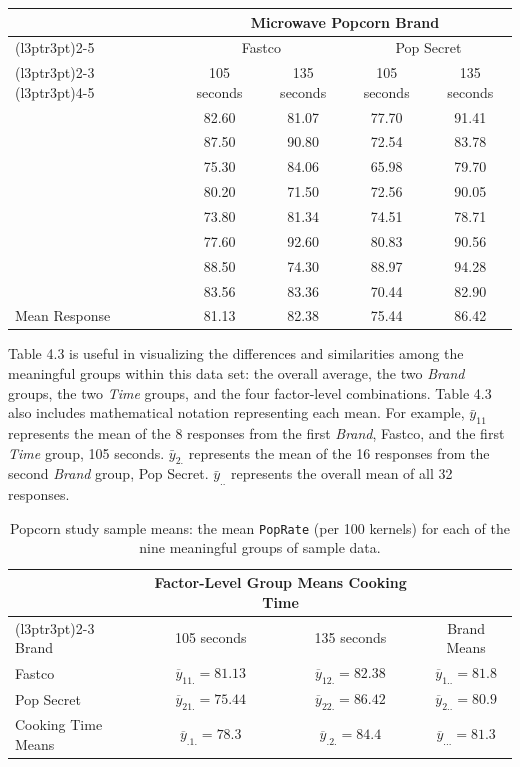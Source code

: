 \documentclass[
]{report}
\begin{document}
\begin{table}[!h]
\centering
\begin{tabular}{lcccc}
\toprule
\multicolumn{1}{c}{ } & \multicolumn{4}{c}{Microwave Popcorn Brand} \\
\cmidrule(l{3pt}r{3pt}){2-5}
\multicolumn{1}{c}{ } & \multicolumn{2}{c}{Fastco} & \multicolumn{2}{c}{Pop Secret} \\
\cmidrule(l{3pt}r{3pt}){2-3} \cmidrule(l{3pt}r{3pt}){4-5}
 & 105 seconds & 135 seconds & 105 seconds & 135 seconds\\
\midrule
 & 82.60 & 81.07 & 77.70 & 91.41\\
 & 87.50 & 90.80 & 72.54 & 83.78\\
 & 75.30 & 84.06 & 65.98 & 79.70\\
 & 80.20 & 71.50 & 72.56 & 90.05\\
 & 73.80 & 81.34 & 74.51 & 78.71\\
\addlinespace
 & 77.60 & 92.60 & 80.83 & 90.56\\
 & 88.50 & 74.30 & 88.97 & 94.28\\
 & 83.56 & 83.36 & 70.44 & 82.90\\
Mean Response & 81.13 & 82.38 & 75.44 & 86.42\\
\bottomrule
\end{tabular}
\end{table}

Table 4.3 is useful in visualizing the differences and similarities among the meaningful groups within this data set: the overall average, the two \emph{Brand} groups, the two \emph{Time} groups, and the four factor-level combinations. Table 4.3 also includes mathematical notation representing each mean. For example, \(\bar{y}_{11}\) represents the mean of the 8 responses from the first \emph{Brand}, Fastco, and the first \emph{Time} group, 105 seconds. \(\bar{y}_{2.}\) represents the mean of the 16 responses from the second \emph{Brand} group, Pop Secret. \(\bar{y}_{..}\) represents the overall mean of all 32 responses.

\begin{table}[!h]
\centering
\caption{\label{tab:tab3} Popcorn study sample means: the mean \texttt{PopRate} (per 100 kernels) for each of the nine meaningful groups of sample data.}
\centering
\begin{tabular}[t]{lccc}
\toprule
\multicolumn{1}{c}{ } & \multicolumn{2}{c}{Factor-Level Group Means Cooking Time} & \multicolumn{1}{c}{ } \\
\cmidrule(l{3pt}r{3pt}){2-3}
Brand & 105 seconds & 135 seconds & Brand Means\\
\midrule
Fastco & $\overline{y}_{11.} = 81.13$ & $\overline{y}_{12.} = 82.38$ & $\overline{y}_{1..} = 81.8$\\
Pop Secret & $\overline{y}_{21.} = 75.44$ & $\overline{y}_{22.} = 86.42$ & $\overline{y}_{2..} = 80.9$\\
Cooking Time Means & $\overline{y}_{.1.} = 78.3$ & $\overline{y}_{.2.} = 84.4$ & $\overline{y}_{...} = 81.3$\\
\bottomrule
\end{tabular}
\end{table}
\end{document}
